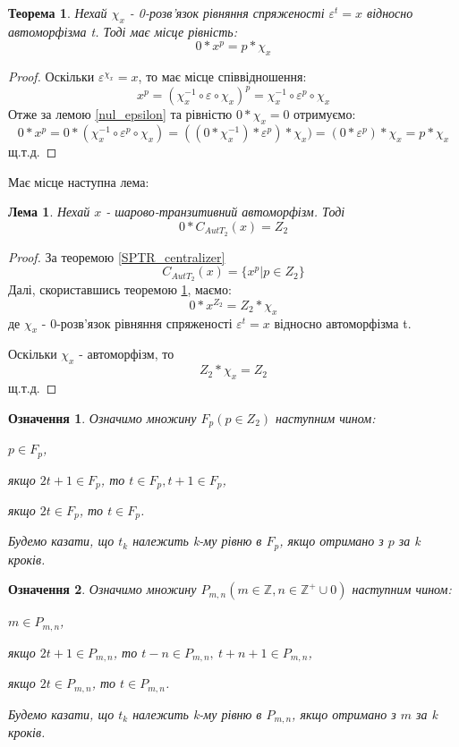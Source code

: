 \documentclass[a4paper,12pt]{article} \usepackage{a4wide}
\numberwithin{equation}{subsection}
\newtheorem{theorem}{Теорема}[subsection]
\newtheorem{lemma}{Лема}[subsection]
\newtheorem{definition}{Означення}[subsection]
\begin{document}
\begin{theorem}\label{nul_action_all}
  Нехай $\chi_x$ - 0-розв'язок рівняння спряженості $\varepsilon^t =
  x$ відносно автоморфізма t. Тоді має місце рівність:
   $$0*x^p=p*\chi_x$$
 \end{theorem}
 \begin{proof}
   Оскільки $\varepsilon^{\chi_x} = x$, то має місце співвідношення:
$$x^p = (\chi_x^{-1}\circ\varepsilon\circ\chi_x)^p=\chi_x^{-1}\circ\varepsilon^p\circ\chi_x$$
Отже за лемою \ref{nul_epsilon} та рівністю $0*\chi_x = 0$ отримуємо:
$$0*x^p=0*(\chi_x^{-1}\circ\varepsilon^p\circ\chi_x) = ((0*\chi_x^{-1})*\varepsilon^p)*\chi_x) = (0*\varepsilon^p)*\chi_x =  p*\chi_x$$  щ.т.д.
\end{proof}

Має місце наступна лема:
\begin{lemma} Нехай $x$ - шарово-транзитивний автоморфізм. Тоді
 $$0*C_{AutT_2}(x)=Z_2 $$
\end{lemma}
\begin{proof}
  За теоремою \ref{SPTR_centralizer} $$C_{AutT_2}(x)=\{x^p|p\in
  Z_2\}$$ Далі, скориставшись теоремою \ref{nul_action_all},
  маємо: $$0*x^{Z_2}=Z_2*\chi_x$$ де $\chi_x$ - 0-розв'язок рівняння
  спряженості $\varepsilon^t = x$ відносно автоморфізма t.

  Оскільки $\chi_x$ - автоморфізм, то $$Z_2*\chi_x = Z_2$$ щ.т.д.
\end{proof}

  \begin{definition}
    Означимо множину $F_p ( p\in Z_2 )$ наступним чином:

    $p\in F_p$,

    якщо $2t+1\in F_p$, то $t\in F_p, t+1\in F_p $,

    якщо $2t\in F_p$, то $t\in F_p $.

    Будемо казати, що $t_k$ належить k-му рівню в $F_p$, якщо отримано
    з $p$ за k кроків.
  \end{definition}

 \begin{definition}
   Означимо множину $P_{m,n} ( m\in \mathbb{Z}, n\in \mathbb{Z}^+\cup
   0 )$ наступним чином:

   $m\in P_{m,n}$,

   якщо $2t+1\in P_{m,n}$, то $t - n\in P_{m,n},\ t+n+1\in P_{m,n} $,

   якщо $2t\in P_{m,n}$, то $t\in P_{m,n} $.

   Будемо казати, що $t_k$ належить k-му рівню в $P_{m,n}$, якщо
   отримано з $m$ за k кроків.
 \end{definition}
\end{document}
